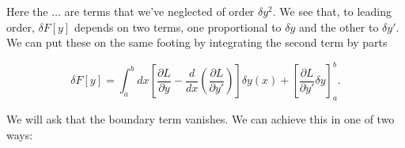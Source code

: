 \documentclass[11pt,a4paper,twoside]{article}
\newcommand{\pnum}[1]{\makebox[0pt][r]{\scriptsize\textbf{[#1]}\hspace{0.7em}}}
\newif\ifstudynotes
\newcommand{\StudyNote}[2]{\ifstudynotes\begin{studyNote}[title={#1}]#2\end{studyNote}\fi}
\begin{document}



\noindent\pnum{9}Here the $\ldots$ are terms that we've neglected of order $\delta y^2$. We see that, to leading order, $\delta F[y]$ depends on two terms, one proportional to $\delta y$ and the other to $\delta y'$. We can put these on the same footing by integrating the second term by parts

\begin{equation}
    \delta F[y]=\int_a^b dx\left[\frac{\partial L}{\partial y}-\frac{d}{dx}\left(\frac{\partial L}{\partial y'}\right)\right]\delta y(x)+\left[\frac{\partial L}{\partial y'}\delta y\right]_a^b.\tag{7.10}
\end{equation}




\StudyNote{複習註解：由 (7.9) 到 (7.10)}{

    這一步使用分部積分。因為 $\delta y'=d(\delta y)/dx$，令

    \[
        u=\frac{\partial L}{\partial y'},\qquad dv=\delta y'\,dx,
        \qquad v=\delta y.
    \]

    套用 $\int u\,dv=[uv]_a^b-\int v\,du$，得到

    \[
        \int_a^b\frac{\partial L}{\partial y'}\delta y'\,dx
        =\left[\frac{\partial L}{\partial y'}\delta y\right]_a^b
        -\int_a^b\frac{d}{dx}\left(\frac{\partial L}{\partial y'}\right)\delta y\,dx.
    \]

    代回 (7.9)，把兩個含 $\delta y$ 的積分合併，就得到 (7.10)。

    這裡的 $d/dx$ 是全導數：$\partial L/\partial y'$ 仍可能透過

    $y(x)$、$y'(x)$ 或顯含的 $x$ 隨 $x$ 改變。

    若兩端點固定，$\delta y(a)=\delta y(b)=0$，邊界項便消失。

}







\noindent\pnum{10}We will ask that the boundary term vanishes. We can achieve this in one of two ways:
\end{document}
